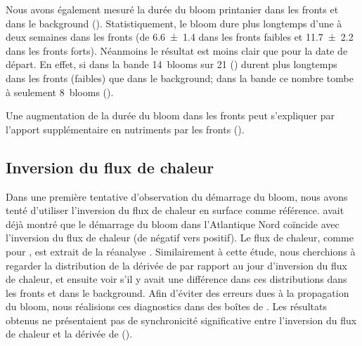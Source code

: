 Nous avons également mesuré la durée du bloom printanier dans les fronts et dans le background ().
Statistiquement, le bloom dure plus longtemps d'une à deux semaines dans les fronts (de \qty{6.6 \pm 1.4}{\jours} dans les fronts faibles et \qty{11.7 \pm 2.2}{\jours} dans les fronts forts).
Néanmoins le résultat est moins clair que pour la date de départ.
En effet, si dans la bande  14~blooms sur 21 () durent plus longtemps dans les fronts (faibles) que dans le background; dans la bande  ce nombre tombe à seulement 8~blooms ().

\begin{figure}
  \centering
  \label{fig:duree-bloom}
\end{figure}

Une augmentation de la durée du bloom dans les fronts peut s'expliquer par l'apport supplémentaire en nutriments par les fronts (\cite{simoes-sousa_2022}).

\subsection{Inversion du flux de chaleur}
\label{sec:flux-chaleur}

Dans une première tentative d'observation du démarrage du bloom, nous avons tenté d'utiliser l'inversion du flux de chaleur en surface comme référence.
\Textcite{ferrari_2015} avait déjà montré que le démarrage du bloom dans l'Atlantique Nord  coïncide avec l'inversion du flux de chaleur (de négatif vers positif).
Le flux de chaleur, comme pour \textcite{ferrari_2015}, est extrait de la réanalyse  .
Similairement à cette étude, nous cherchions à regarder la distribution de la dérivée de  par rapport au jour d'inversion du flux de chaleur, et ensuite voir s'il y avait une différence dans ces distributions dans les fronts et dans le background.
Afin d'éviter des erreurs dues à la propagation du bloom, nous réalisions ces diagnostics dans des boîtes de .
Les résultats obtenus ne présentaient pas de synchronicité significative entre l'inversion du flux de chaleur et la dérivée de  ().

